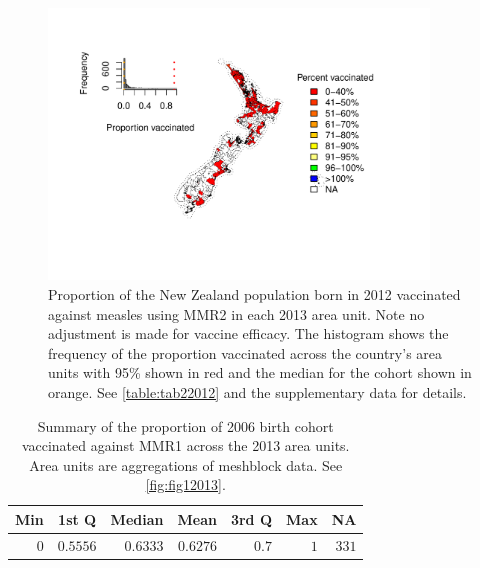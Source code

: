 \documentclass{article}
\begin{document}
\begin{figure}
\begin{center}
    \includegraphics[width=0.9\textwidth]{nir_census_MMR2_NIR_2012.pdf}
 \end{center}
    \caption{Proportion of the New Zealand population born in 2012 vaccinated against measles using MMR2 in each 2013 area unit. Note no adjustment is made for vaccine efficacy. The histogram shows the frequency of the proportion vaccinated across the country's area units with 95\% shown in red and the median for the cohort shown in orange. See \autoref{table:tab22012} and the supplementary data for details.}
\label{fig:fig22012}
\end{figure}

 \vspace{5mm} %
\begin{table}
\begin{center}
\begin{tabular}{rrrrrrr}
\hline\hline
\multicolumn{1}{c}{Min}&\multicolumn{1}{c}{1st Q}&\multicolumn{1}{c}{Median}&\multicolumn{1}{c}{Mean}&\multicolumn{1}{c}{3rd Q}&\multicolumn{1}{c}{Max}&\multicolumn{1}{c}{NA}\tabularnewline
\hline
$0$&$0.5556$&$0.6333$&$0.6276$&$0.7$&$1$&$331$\tabularnewline
\hline
\end{tabular}\end{center}\caption{Summary of the proportion of 2006 birth cohort vaccinated against MMR1 across the 2013 area units. Area units are aggregations of meshblock data. See \autoref{fig:fig12013}.}
\label{table:tab12013}
\end{table}
\end{document}
